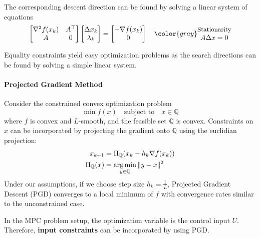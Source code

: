 The corresponding descent direction can be found by solving a linear system of equations
\begin{equation*}
    \begin{bmatrix}
        \nabla^2 f(x_k) & A^\top \\
        A               & 0
    \end{bmatrix}\begin{bmatrix}
        \Delta x_k \\
        \lambda_k
    \end{bmatrix}
    = \begin{bmatrix}
        -\nabla f(x_k) \\
        0
    \end{bmatrix} \quad {\color{gray}\begin{matrix}
            \text{\small{Stationarity}} \\
            A\Delta x = 0
        \end{matrix}}
\end{equation*}
\newpar{}

Equality constraints yield easy optimization problems as the search directions can be found by solving a simple linear system.

\paragraph{Projected Gradient Method}

Consider the constrained convex optimization problem
\begin{equation*}
    \min f(x) \quad \text{subject to} \quad x \in \mathbb{Q}
\end{equation*}
where $f$ is convex and $L$-smooth, and the feasible set $\mathbb{Q}$ is convex.
\newpar{}
Constraints on $x$ can be incorporated by projecting the gradient onto $\mathbb{Q}$ using the euclidian projection:
\begin{align*}
    x_{k+1}             & = \Pi_{\mathbb{Q}}(x_k - h_k \nabla f(x_k)) \\
    \Pi_{\mathbb{Q}}(x) & = \operatorname*{arg\,min}_{y\in\mathbb{Q}} \|y-x\|^2
\end{align*}
Under our assumptions, if we choose step size $h_k = \frac{1}{L}$, Projected Gradient Descent (PGD) converges to a local minimum of $f$ with convergence rates similar to the unconstrained case.

\newpar{}

In the MPC problem setup, the optimization variable is the control input $U$. Therefore, \textbf{input constraints} can be incorporated by using PGD.

